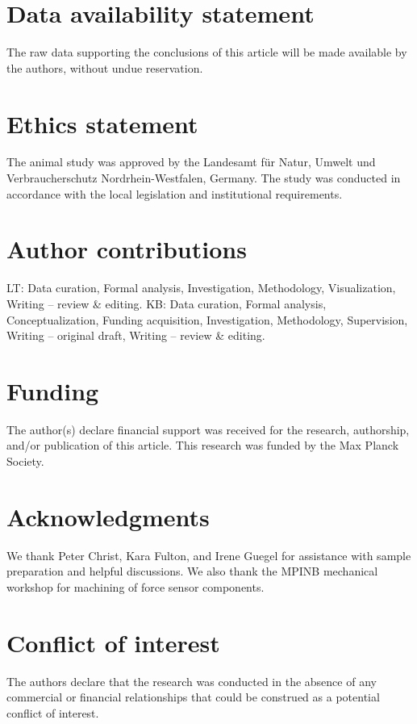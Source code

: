 \documentclass{article}
\begin{document}
\section*{Data availability statement}

The raw data supporting the conclusions of this article will be made available by the authors, without undue reservation.

\section*{Ethics statement}

The animal study was approved by the Landesamt für Natur, Umwelt und Verbraucherschutz Nordrhein-Westfalen, Germany. The study was conducted in accordance with the local legislation and institutional requirements.

\section*{Author contributions}

LT: Data curation, Formal analysis, Investigation, Methodology, Visualization, Writing – review \& editing. KB: Data curation, Formal analysis, Conceptualization, Funding acquisition, Investigation, Methodology, Supervision, Writing – original draft, Writing – review \& editing.

\section*{Funding}

The author(s) declare financial support was received for the research, authorship, and/or publication of this article. This research was funded by the Max Planck Society.

\section*{Acknowledgments}

We thank Peter Christ, Kara Fulton, and Irene Guegel for assistance with sample preparation and helpful discussions. We also thank the MPINB mechanical workshop for machining of force sensor components.

\section*{Conflict of interest}

The authors declare that the research was conducted in the absence of any commercial or financial relationships that could be construed as a potential conflict of interest.
\end{document}
